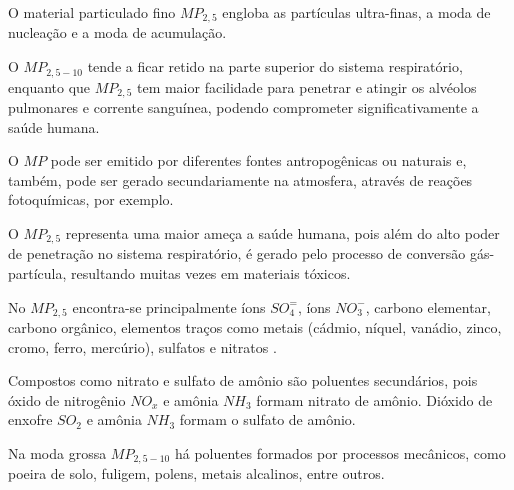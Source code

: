 O material particulado fino $MP_{2,5}$ engloba as partículas 
ultra-finas, a moda de nucleação e a moda de acumulação.  

O $MP_{2,5-10}$ tende a ficar retido na parte superior do sistema respiratório, 
enquanto que $MP_{2,5}$ tem maior facilidade para penetrar e atingir 
os alvéolos pulmonares e corrente sanguínea, 
podendo comprometer significativamente a saúde humana. 

O $MP$ pode ser emitido por diferentes fontes antropogênicas ou naturais e, 
também, pode ser gerado secundariamente na atmosfera, através de 
reações fotoquímicas, por exemplo. 

O $MP_{2,5}$ representa uma maior ameça a saúde humana, pois além 
do alto poder de penetração no sistema respiratório,
é gerado pelo processo de conversão gás-partícula, resultando muitas vezes em materiais tóxicos.

No $MP_{2,5}$ encontra-se principalmente íons $SO_4^=$, 
íons $ NO_3^-$, carbono elementar, carbono orgânico, 
elementos traços como metais 
(cádmio, níquel, vanádio, zinco, cromo, ferro, mercúrio), 
sulfatos e nitratos \citep{finlayson1999}. 

Compostos como nitrato e sulfato de amônio são poluentes secundários,
pois óxido de nitrogênio $NO_x$ e amônia $NH_3$ formam nitrato de amônio. 
Dióxido de enxofre $SO_2$ e amônia $NH_3$ formam o sulfato de amônio. 

Na moda grossa $MP_{2,5-10}$ há poluentes formados por processos mecânicos, 
como poeira de solo, fuligem, polens, metais alcalinos, entre outros.%



